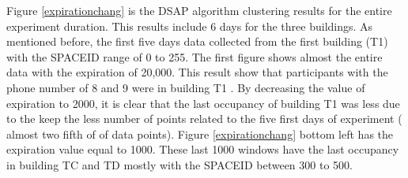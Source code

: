 
Figure \ref{expirationchang} is the DSAP algorithm clustering results for the entire experiment duration. This results include 6 days for the three buildings. As mentioned before, the first five days data collected from the first building (T1) with the SPACEID range of 0 to 255.
The first figure shows almost the entire data with the expiration of 20,000. This result show that participants with the phone number of 8 and 9 were in building T1 . By decreasing the value of expiration to 2000, it is clear that the last occupancy of building T1 was less due to the keep the less number of points related to the five first days of experiment ( almost two fifth of of data points). Figure \ref{expirationchang} bottom left has the expiration value equal to 1000. These last 1000 windows have the last occupancy in building TC and TD mostly with the SPACEID between 300 to 500.


